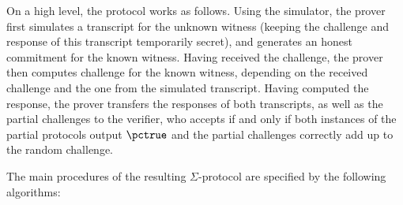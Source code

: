 \documentclass[runningheads,11pt]{article}
\begin{document}
	On a high level, the protocol works as follows.
	Using the simulator, the prover first simulates a transcript for the unknown witness (keeping the challenge and response of this transcript temporarily secret), and generates an honest commitment for the known witness.
	Having received the challenge, the prover then computes challenge for the known witness, depending on the received challenge and the one from the simulated transcript.
	Having computed the response, the prover transfers the responses of both transcripts, as well as the partial challenges to the verifier, who accepts if and only if both instances of the partial protocols output $\accept$ and the partial challenges correctly add up to the random challenge.

The main procedures of the resulting $\Sigma$-protocol are specified by the following algorithms:
\end{document}
